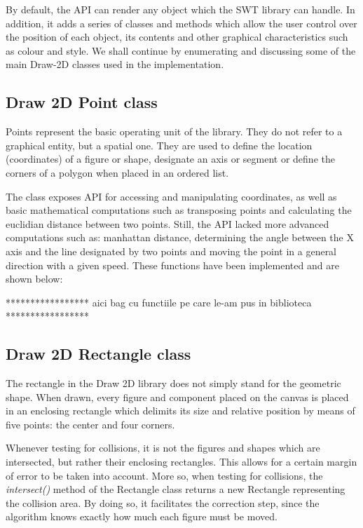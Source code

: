 By default, the API can render any object which the SWT library can handle. In addition, it adds a series of 
classes and methods which allow the user control over the position of each object, its contents and other 
graphical characteristics such as colour and style. We shall continue by enumerating and discussing some of 
the main Draw-2D classes used in the implementation.

\subsection{Draw 2D Point class}

Points represent the basic operating unit of the library. They do not refer to a graphical entity, but a 
spatial one. They are used to define the location (coordinates) of a figure or shape, designate an axis 
or segment or define the corners of a polygon when placed in an ordered list.

The class exposes API for accessing and manipulating coordinates, as well as basic mathematical computations 
such as transposing points and calculating the euclidian distance between two points. Still, the API lacked more 
advanced computations such as: manhattan distance, determining the angle between the X axis and the line 
designated by two points and moving the point in a general direction with a given speed. These functions 
have been implemented and are shown below:

***************** aici bag cu functiile pe care le-am pus in biblioteca *****************

\subsection{Draw 2D Rectangle class}

The rectangle in the Draw 2D library does not simply stand for the geometric shape. When drawn, every 
figure and component placed on the canvas is placed in an enclosing rectangle which delimits its size 
and relative position by means of five points: the center and four corners. 

Whenever testing for collisions, it is not the figures and shapes which are intersected, but rather their 
enclosing rectangles. This allows for a certain margin of error to be taken into account. More so, when 
testing for collisions, the \emph{intersect()} method of the Rectangle class returns a new Rectangle 
representing the collision area. By doing so, it facilitates the correction step, since the algorithm 
knows exactly how much each figure must be moved.

